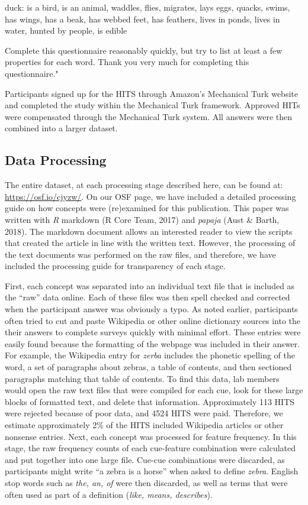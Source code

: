 \documentclass[english,,man]{apa6}
\theoremstyle{definition}
\theoremstyle{definition}
\theoremstyle{definition}
\theoremstyle{remark}
\begin{document}
duck: is a bird, is an animal, waddles, flies, migrates, lays eggs,
quacks, swims, has wings, has a beak, has webbed feet, has feathers,
lives in ponds, lives in water, hunted by people, is edible

Complete this questionnaire reasonably quickly, but try to list at least
a few properties for each word. Thank you very much for completing this
questionnaire."

Participants signed up for the HITS through Amazon's Mechanical Turk
website and completed the study within the Mechanical Turk framework.
Approved HITs were compensated through the Mechanical Turk system. All
answers were then combined into a larger dataset.

\hypertarget{data-processing}{%
\subsection{Data Processing}\label{data-processing}}

The entire dataset, at each processing stage described here, can be
found at: \url{https://osf.io/cjyzw/}. On our OSF page, we have included
a detailed processing guide on how concepts were (re)examined for this
publication. This paper was written with \emph{R} markdown (R Core Team,
2017) and \emph{papaja} (Aust \& Barth, 2018). The markdown document
allows an interested reader to view the scripts that created the article
in line with the written text. However, the processing of the text
documents was performed on the raw files, and therefore, we have
included the processing guide for transparency of each stage.

First, each concept was separated into an individual text file that is
included as the \enquote{raw} data online. Each of these files was then
spell checked and corrected when the participant answer was obviously a
typo. As noted earlier, participants often tried to cut and paste
Wikipedia or other online dictionary sources into the their answers to
complete surveys quickly with minimal effort. These entries were easily
found because the formatting of the webpage was included in their
answer. For example, the Wikipedia entry for \emph{zerba} includes the
phonetic spelling of the word, a set of paragraphs about zebras, a table
of contents, and then sectioned paragraphs matching that table of
contents. To find this data, lab members would open the raw text files
that were compiled for each cue, look for these large blocks of
formatted text, and delete that information. Approximately 113 HITS were
rejected because of poor data, and 4524 HITS were paid. Therefore, we
estimate approximately 2\% of the HITS included Wikipedia articles or
other nonsense entries. Next, each concept was processed for feature
frequency. In this stage, the raw frequency counts of each cue-feature
combination were calculated and put together into one large file.
Cue-cue combinations were discarded, as participants might write
\enquote{a zebra is a horse} when asked to define \emph{zebra}. English
stop words such as \emph{the, an, of} were then discarded, as well as
terms that were often used as part of a definition (\emph{like, means,
describes}).
\end{document}
